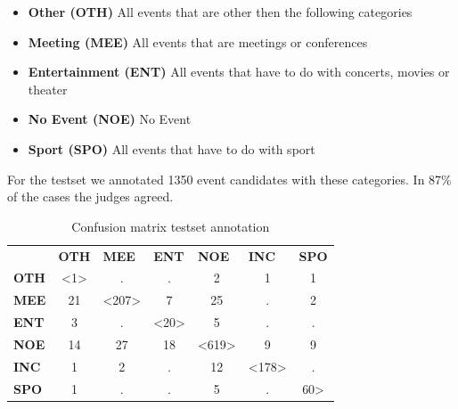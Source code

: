 \documentclass[
10pt, %
a4paper, %
oneside, %
headinclude,footinclude, %
BCOR5mm, %
]{scrartcl}
\begin{document}
\begin{itemize}[noitemsep] %
\item \textbf{Other (OTH)} All events that are other then the following categories 
\item \textbf{Meeting (MEE)} All events that are meetings or conferences 
\item \textbf{Entertainment (ENT)} All events that have to do with concerts, movies or theater
\item \textbf{No Event (NOE)} No Event
\item \textbf{Sport (SPO)} All events that have to do with sport 
\end{itemize}
For the testset we annotated 1350 event candidates with these categories. In 87\% of the cases the judges agreed.

\begin{table}[h]
\begin{tabular}{lcccccc}
 & \multicolumn{1}{l}{\textbf{OTH}} & \multicolumn{1}{l}{\textbf{MEE}} & \multicolumn{1}{l}{\textbf{ENT}} & \multicolumn{1}{l}{\textbf{NOE}} & \multicolumn{1}{l}{\textbf{INC}} & \multicolumn{1}{l}{\textbf{SPO}} \\ \cline{2-7} 
\multicolumn{1}{l|}{\textbf{OTH}} & \multicolumn{1}{c|}{\textless1\textgreater} & \multicolumn{1}{c|}{.} & \multicolumn{1}{c|}{.} & \multicolumn{1}{c|}{2} & \multicolumn{1}{c|}{1} & \multicolumn{1}{c|}{1} \\ \cline{2-7} 
\multicolumn{1}{l|}{\textbf{MEE}} & \multicolumn{1}{c|}{21} & \multicolumn{1}{c|}{\textless207\textgreater} & \multicolumn{1}{c|}{7} & \multicolumn{1}{c|}{25} & \multicolumn{1}{c|}{.} & \multicolumn{1}{c|}{2} \\ \cline{2-7} 
\multicolumn{1}{l|}{\textbf{ENT}} & \multicolumn{1}{c|}{3} & \multicolumn{1}{c|}{.} & \multicolumn{1}{c|}{\textless20\textgreater} & \multicolumn{1}{c|}{5} & \multicolumn{1}{c|}{.} & \multicolumn{1}{c|}{.} \\ \cline{2-7} 
\multicolumn{1}{l|}{\textbf{NOE}} & \multicolumn{1}{c|}{14} & \multicolumn{1}{c|}{27} & \multicolumn{1}{c|}{18} & \multicolumn{1}{c|}{\textless619\textgreater} & \multicolumn{1}{c|}{9} & \multicolumn{1}{c|}{9} \\ \cline{2-7} 
\multicolumn{1}{l|}{\textbf{INC}} & \multicolumn{1}{c|}{1} & \multicolumn{1}{c|}{2} & \multicolumn{1}{c|}{.} & \multicolumn{1}{c|}{12} & \multicolumn{1}{c|}{\textless178\textgreater} & \multicolumn{1}{c|}{.} \\ \cline{2-7} 
\multicolumn{1}{l|}{\textbf{SPO}} & \multicolumn{1}{c|}{1} & \multicolumn{1}{c|}{.} & \multicolumn{1}{c|}{.} & \multicolumn{1}{c|}{5} & \multicolumn{1}{c|}{.} & \multicolumn{1}{c|}{60\textgreater} \\ \cline{2-7} 
\end{tabular}
\caption[Table caption text]{Confusion matrix testset annotation }
\end{table}
\end{document}
